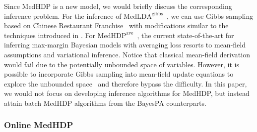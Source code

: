 \documentclass[twoside,11pt]{article}
\newcommand\MedHDPave{$\text{MedHDP}^{\text{ave}}$~}
\newcommand\MedLDAgibbs{$\text{MedLDA}^{\text{gibbs}}$~}
\begin{document}
Since MedHDP is a new model, we would briefly discuss the corresponding inference problem. For the inference of \MedLDAgibbs, we can use Gibbs sampling based on Chinese Restaurant Franchise~\citep{teh2006hierarchical, wang2012split} with  modifications similar to the techniques introduced in \cite{zhugibbs2013}. For \MedHDPave, the current state-of-the-art for inferring max-margin Bayesian models with averaging loss resorts to mean-field assumptions and variational inference. Notice that classical mean-field derivation would fail due to the potentially unbounded space of variables. However, it is possible to incorporate Gibbs sampling into mean-field update equations to explore the unbounded space~\citep{welling2008hybrid, wang2012truncation} and therefore bypass the difficulty. In this paper, we would not focus on developing inference algorithms for MedHDP, but instead attain batch MedHDP algorithms from the BayesPA counterparts.


\subsubsection{Online MedHDP}
\end{document}

